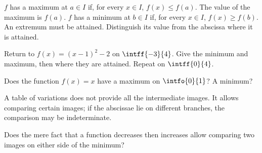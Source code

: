 \begin{keypoint}[Definitions]
$f$ has a maximum at $a\in I$ if, for every $x\in I$, $f(x)\leq f(a)$. The value of the maximum is $f(a)$.
$f$ has a minimum at $b\in I$ if, for every $x\in I$, $f(x)\geq f(b)$.
An extremum must be attained. Distinguish its value from the abscissa where it is attained.
\end{keypoint}
\begin{example}Return to $f(x)=(x-1)^2-2$ on $\intff{-3}{4}$. Give the minimum and maximum, then where they are attained. Repeat on $\intff{0}{4}$.\end{example}
\begin{example}Does the function $f(x)=x$ have a maximum on $\intfo{0}{1}$? A minimum?\end{example}
\begin{keypoint}
A table of variations does not provide all the intermediate images. It allows comparing certain images; if the abscissae lie on different branches, the comparison may be indeterminate.
\end{keypoint}
\begin{example}Does the mere fact that a function decreases then increases allow comparing two images on either side of the minimum?\end{example}

